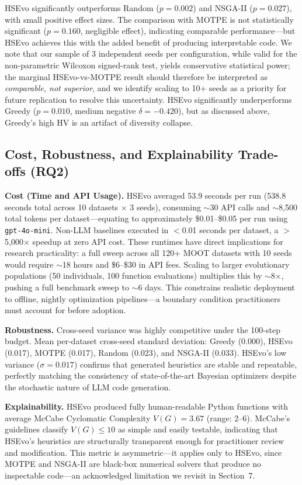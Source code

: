 \documentclass[sigconf,nonacm]{acmart}
\begin{document}
HSEvo significantly outperforms Random ($p=0.002$) and NSGA-II ($p=0.027$), with small positive effect sizes. The comparison with MOTPE is not statistically significant
($p = 0.160$, negligible effect), indicating comparable
performance—but HSEvo achieves this with the added benefit
of producing interpretable code. We note that our sample of
3 independent seeds per configuration, while valid for the
non-parametric Wilcoxon signed-rank test, yields conservative
statistical power; the marginal HSEvo-vs-MOTPE result should
therefore be interpreted as \emph{comparable, not superior},
and we identify scaling to 10+ seeds as a priority for future
replication to resolve this uncertainty. HSEvo significantly underperforms Greedy ($p=0.010$, medium negative $\delta=-0.420$), but as discussed above, Greedy's high HV is an artifact of diversity collapse.

\subsection{Cost, Robustness, and Explainability Trade-offs (RQ2)}

\textbf{Cost (Time and API Usage).} HSEvo averaged 53.9 seconds
per run (538.8 seconds total across 10 datasets $\times$ 3 seeds),
consuming $\sim$30 API calls and $\sim$8,500 total tokens per
dataset---equating to approximately \$0.01--\$0.05 per run using
\texttt{gpt-4o-mini}. Non-LLM baselines executed in $<$0.01
seconds per dataset, a $>$5{,}000$\times$ speedup at zero API
cost. These runtimes have direct implications for research
practicality: a full sweep across all 120+ MOOT datasets with 10
seeds would require $\sim$18 hours and \$6--\$30 in API fees.
Scaling to larger evolutionary populations (50 individuals, 100
function evaluations) multiplies this by $\sim$8$\times$, pushing
a full benchmark sweep to $\sim$6 days. This constrains realistic
deployment to offline, nightly optimization pipelines---a boundary
condition practitioners must account for before adoption.

\textbf{Robustness.} Cross-seed variance was highly competitive
under the 100-step budget. Mean per-dataset cross-seed standard
deviation: Greedy (0.000), HSEvo (0.017), MOTPE (0.017), Random
(0.023), and NSGA-II (0.033). HSEvo's low variance ($\sigma=0.017$)
confirms that generated heuristics are stable and repeatable,
perfectly matching the consistency of state-of-the-art Bayesian
optimizers despite the stochastic nature of LLM code generation.

\textbf{Explainability.} HSEvo produced fully human-readable
Python functions with average McCabe Cyclomatic Complexity
$V(G) = 3.67$ (range: 2--6). McCabe's guidelines classify
$V(G) \leq 10$ as simple and easily testable, indicating that
HSEvo's heuristics are structurally transparent enough for
practitioner review and modification. This metric is
asymmetric---it applies only to HSEvo, since MOTPE and NSGA-II
are black-box numerical solvers that produce no inspectable
code---an acknowledged limitation we revisit in Section~7.
\end{document}
